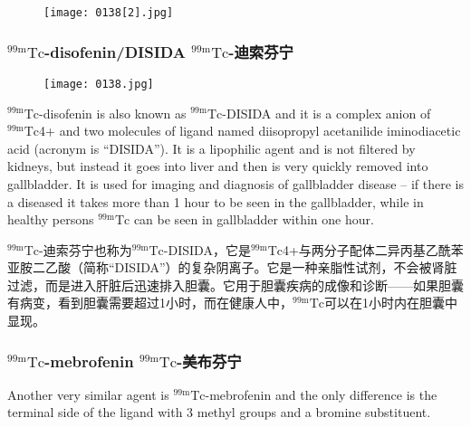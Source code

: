 \documentclass[dvipsnames, svgnames,a4paper,11pt]{article}
\begin{document}
\begin{figure}[h]
	\centering
    \texttt{[image: 0138[2].jpg]}    
     \label{fig143}
\end{figure}

\subsubsection{${}^\mathrm{99m}\mathrm{Tc}$-disofenin/DISIDA ${}^\mathrm{99m}\mathrm{Tc}$-迪索芬宁 }

\begin{figure}[h]
	\centering
    \texttt{[image: 0138.jpg]}    
     \label{fig144}
\end{figure}

${}^\mathrm{99m}\mathrm{Tc}$-disofenin is also known as ${}^\mathrm{99m}\mathrm{Tc}$-DISIDA and it is a complex anion of ${}^\mathrm{99m}\mathrm{Tc}$4+
and two molecules of ligand named diisopropyl acetanilide iminodiacetic acid
(acronym is “DISIDA”). It is a lipophilic agent and is not filtered by kidneys, but
instead it goes into liver and then is very quickly removed into gallbladder. It is used
for imaging and diagnosis of gallbladder disease – if there is a diseased it takes
more than 1 hour to be seen in the gallbladder, while in healthy persons ${}^\mathrm{99m}\mathrm{Tc}$ can
be seen in gallbladder within one hour.

${}^\mathrm{99m}\mathrm{Tc}$-迪索芬宁也称为${}^\mathrm{99m}\mathrm{Tc}$-DISIDA，它是${}^\mathrm{99m}\mathrm{Tc}$4+与两分子配体二异丙基乙酰苯亚胺二乙酸（简称“DISIDA”）的复杂阴离子。它是一种亲脂性试剂，不会被肾脏过滤，而是进入肝脏后迅速排入胆囊。它用于胆囊疾病的成像和诊断——如果胆囊有病变，看到胆囊需要超过1小时，而在健康人中，${}^\mathrm{99m}\mathrm{Tc}$可以在1小时内在胆囊中显现。



\subsubsection{${}^\mathrm{99m}\mathrm{Tc}$-mebrofenin ${}^\mathrm{99m}\mathrm{Tc}$-美布芬宁}

Another very similar agent is ${}^\mathrm{99m}\mathrm{Tc}$-mebrofenin and the only difference is the terminal
side of the ligand with 3 methyl groups and a bromine substituent.
\end{document}
